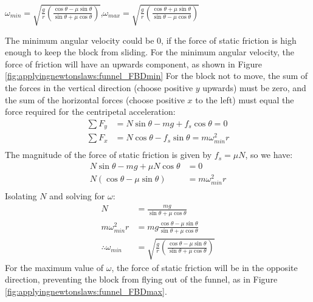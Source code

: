 \begin{finalanswer}
$\omega_{min} = \sqrt{\frac{g}{r}\left(\frac{\cos\theta-\mu\sin\theta}{\sin\theta+\mu\cos\theta}\right)}$,$\omega_{max} = \sqrt{\frac{g}{r}\left(\frac{\cos\theta+\mu\sin\theta}{\sin\theta-\mu\cos\theta}\right)}$
\end{finalanswer}
\begin{solution}
The minimum angular velocity could be 0, if the force of static friction is high enough to keep the block from sliding.  For the minimum angular velocity, the force of friction will have an upwards component, as shown in Figure \ref{fig:applyingnewtonslaws:funnel_FBDmin}
For the block not to move, the sum of the forces in the vertical direction (choose positive $y$ upwards) must be zero, and the sum of the horizontal forces (choose positive $x$ to the left) must equal the force required for the centripetal acceleration:
\begin{align*}
\sum F_y &= N\sin\theta-mg+f_s\cos\theta = 0 \\
\sum F_x &= N\cos\theta-f_s\sin\theta = m\omega_{min}^2 r \\
\end{align*}
The magnitude of the force of static friction is given by $f_s=\mu N$, so we have:
\begin{align*}
 N\sin\theta-mg+\mu N\cos\theta &= 0 \\
 N(\cos\theta-\mu\sin\theta) &= m\omega_{min}^2 r \\
\end{align*}
Isolating $N$ and solving for $\omega$:
\begin{align*}
N &= \frac{mg}{\sin\theta+\mu\cos\theta}\\
m\omega_{min}^2 r &= mg\frac{\cos\theta-\mu\sin\theta}{\sin\theta+\mu\cos\theta}\\
\therefore \omega_{min} &= \sqrt{\frac{g}{r}\left(\frac{\cos\theta-\mu\sin\theta}{\sin\theta+\mu\cos\theta}\right)}
\end{align*}
For the maximum value of $\omega$, the force of static friction will be in the opposite direction, preventing the block from flying out of the funnel, as in Figure \ref{fig:applyingnewtonslaws:funnel_FBDmax}.

\end{solution}
